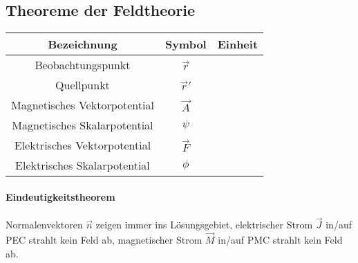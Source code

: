 \subsection*{Theoreme der Feldtheorie}
\begin{center}
\begin{tabular}{ccc} \toprule
Bezeichnung & Symbol & Einheit \\ \midrule
Beobachtungspunkt & $\vec{r}$ & \\
Quellpunkt & $\vec{r}'$ & \\
Magnetisches Vektorpotential & $\vec{A}$ & \\
Magnetisches Skalarpotential & $\psi$ & \\
Elektrisches Vektorpotential & $\vec{F}$ & \\
Elektrisches Skalarpotential & $\phi$ & \\
\bottomrule
\end{tabular}
\end{center}
\begin{center}
\begin{minipage}[c]{0.4\linewidth}
\begin{tikzpicture}[scale=0.5]
	
\end{tikzpicture}
\end{minipage}
\begin{minipage}[c]{0.5\linewidth}
\paragraph{Eindeutigkeitstheorem} Normalenvektoren $\vec{n}$ zeigen immer ins Lösungsgebiet, elektrischer Strom $\vec{J}$ in/auf PEC strahlt kein Feld ab, magnetischer Strom $\vec{M}$ in/auf PMC strahlt kein Feld ab.
\end{minipage}
\end{center}

